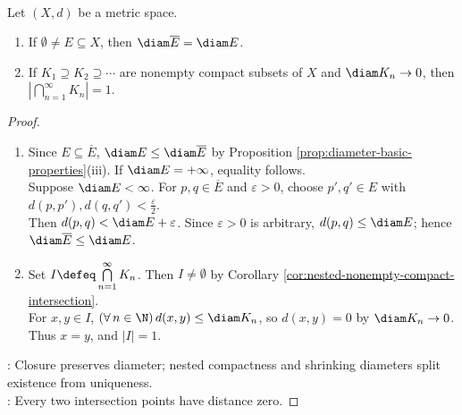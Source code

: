 \begin{theorem} \label{thm:nested-compact-diameters-singleton} \\
Let $(X,d)$ be a metric space.
\begin{enumerate}[label=(\roman*)]
\setlength{\itemsep}{0pt}
\item If $\emptyset\ne E\subseteq X$, then $\diam\overline{E}=\diam E$.
\item If $K_1\supseteq K_2\supseteq\cdots$ are nonempty compact subsets of $X$ and $\diam K_n\to0$, then $\left|\bigcap\limits_{n=1}^{\infty}K_n\right|=1$.
\end{enumerate}
\begin{proof}
\begin{enumerate}[label=(\roman*)]
\setlength{\itemsep}{0pt}
\item Since $E\subseteq\overline{E}$, $\diam E\leq\diam\overline{E}$ by Proposition \ref{prop:diameter-basic-properties}(iii). If $\diam E=+\infty$, equality follows.\\
Suppose $\diam E<\infty$. For $p,q\in\overline{E}$ and $\varepsilon>0$, choose $p',q'\in E$ with $d(p,p'),d(q,q')<\frac{\varepsilon}{2}$.\\
Then $d(p,q)<\diam E+\varepsilon$. Since $\varepsilon>0$ is arbitrary, $d(p,q)\leq\diam E$; hence $\diam\overline{E}\leq\diam E$.
\item Set $I\defeq\bigcap\limits_{n=1}^{\infty}K_n$. Then $I\ne\emptyset$ by Corollary \ref{cor:nested-nonempty-compact-intersection}.\\
For $x,y\in I$, $(\forall\,n\in\N)\,d(x,y)\leq\diam K_n$, so $d(x,y)=0$ by $\diam K_n\to0$. Thus $x=y$, and $|I|=1$.
\end{enumerate}
: Closure preserves diameter; nested compactness and shrinking diameters split existence from uniqueness.\\
: Every two intersection points have distance zero.
\end{proof}
\end{theorem}

